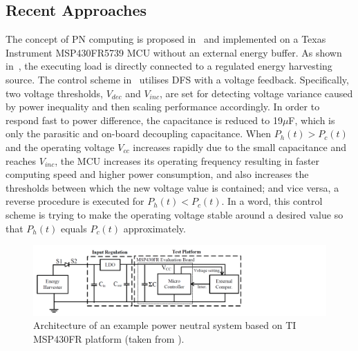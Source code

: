 \subsection{Recent Approaches}

The concept of PN computing is proposed in~\cite{balsamo2016graceful} and implemented on a Texas Instrument MSP430FR5739 MCU without an external energy buffer. As shown in~, the executing load is directly connected to a regulated energy harvesting source. The control scheme in~\cite{balsamo2016graceful} utilises DFS with a voltage feedback. Specifically, two voltage thresholds, $V_{dec}$ and $V_{inc}$, are set for detecting voltage variance caused by power inequality and then scaling performance accordingly. In order to respond fast to power difference, the capacitance is reduced to 19$\mu$F, which is only the parasitic and on-board decoupling capacitance. When $P_h(t) > P_c(t)$ and the operating voltage $V_{cc}$ increases rapidly due to the small capacitance and reaches $V_{inc}$, the MCU increases its operating frequency resulting in faster computing speed and higher power consumption, and also increases the thresholds between which the new voltage value is contained; and vice versa, a reverse procedure is executed for $P_h(t) < P_c(t)$. In a word, this control scheme is trying to make the operating voltage stable around a desired value so that $P_h(t)$  equals $P_c(t)$ approximately.

\begin{figure}
    \centering
    \includegraphics[width=\columnwidth]{ch2_review/figures/graceful_schematic}
    \caption{Architecture of an example power neutral system based on TI MSP430FR platform (taken from \cite{balsamo2016graceful}).}
    \label{Figure:graceful_schematic}
\end{figure}

